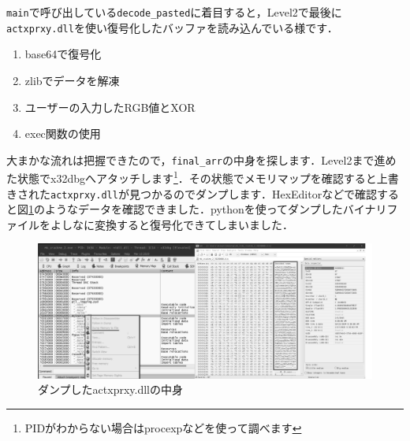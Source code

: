 \texttt{main}で呼び出している\texttt{decode\_pasted}に着目すると，Level2で最後に\texttt{actxprxy.dll}を使い復号化したバッファを読み込んでいる様です．
\begin{enumerate}
  \item base64で復号化
  \item zlibでデータを解凍
  \item ユーザーの入力したRGB値とXOR
  \item exec関数の使用
\end{enumerate}
大まかな流れは把握できたので，\texttt{final\_arr}の中身を探します．Level2まで進めた状態でx32dbgへアタッチします\footnote{PIDがわからない場合はprocexpなどを使って調べます}．その状態でメモリマップを確認すると上書きされた\texttt{actxprxy.dll}が見つかるのでダンプします．HexEditorなどで確認すると図\ref{fig:debug_dll}のようなデータを確認できました．pythonを使ってダンプしたバイナリファイルをよしなに変換すると復号化できてしまいました．
\begin{figure}[H]
    \centering
    \includegraphics[width=\linewidth]{./assets/takuzoo3868asset/attach_mb_gray.png}
    \caption{ダンプしたactxprxy.dllの中身}
    \label{fig:debug_dll}
\end{figure}
